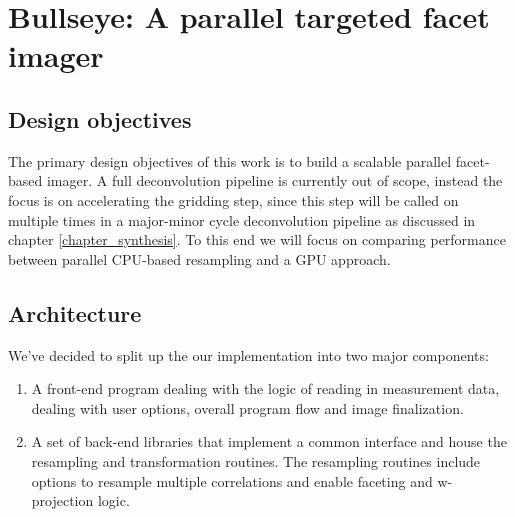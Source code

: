 \chapter{Bullseye: A parallel targeted facet imager}
\section{Design objectives}
The primary design objectives of this work is to build a scalable parallel facet-based imager. A full deconvolution pipeline is currently out of scope, instead 
the focus is on accelerating the gridding step, since this step will be called on multiple times in a major-minor cycle deconvolution pipeline as discussed in 
chapter \ref{chapter_synthesis}. To this end we will focus on comparing performance between parallel CPU-based resampling and a GPU approach.
\section{Architecture}
We've decided to split up the our implementation into two major components:
\begin{enumerate}
 \item A front-end program dealing with the logic of reading in measurement data, dealing with user options, overall program flow and image finalization.
 \item A set of back-end libraries that implement a common interface and house the resampling and transformation routines. The resampling routines include options to resample multiple
 correlations and enable faceting and w-projection logic.
\end{enumerate}

